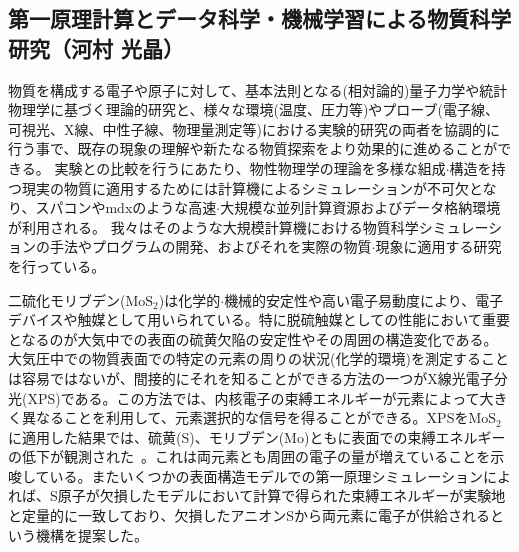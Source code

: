 \subsection{第一原理計算とデータ科学・機械学習による物質科学研究（河村 光晶）}

物質を構成する電子や原子に対して、基本法則となる(相対論的)量子力学や統計物理学に基づく理論的研究と、様々な環境(温度、圧力等)やプローブ(電子線、可視光、X線、中性子線、物理量測定等)における実験的研究の両者を協調的に行う事で、既存の現象の理解や新たなる物質探索をより効果的に進めることができる。
実験との比較を行うにあたり、物性物理学の理論を多様な組成$\cdot$構造を持つ現実の物質に適用するためには計算機によるシミュレーションが不可欠となり、スパコンやmdxのような高速$\cdot$大規模な並列計算資源およびデータ格納環境が利用される。
我々はそのような大規模計算機における物質科学シミュレーションの手法やプログラムの開発、およびそれを実際の物質$\cdot$現象に適用する研究を行っている。

二硫化モリブデン($\textrm{MoS}_2$)は化学的$\cdot$機械的安定性や高い電子易動度により、電子デバイスや触媒として用いられている。特に脱硫触媒としての性能において重要となるのが大気中での表面の硫黄欠陥の安定性やその周囲の構造変化である。
大気圧中での物質表面での特定の元素の周りの状況(化学的環境)を測定することは容易ではないが、間接的にそれを知ることができる方法の一つがX線光電子分光(XPS)である。この方法では、内核電子の束縛エネルギーが元素によって大きく異なることを利用して、元素選択的な信号を得ることができる。XPSを$\textrm{MoS}_2$に適用した結果では、硫黄(S)、モリブデン(Mo)ともに表面での束縛エネルギーの低下が観測された~\cite{kawamura_mos2}。これは両元素とも周囲の電子の量が増えていることを示唆している。またいくつかの表面構造モデルでの第一原理シミュレーションによれば、S原子が欠損したモデルにおいて計算で得られた束縛エネルギーが実験地と定量的に一致しており、欠損したアニオンSから両元素に電子が供給されるという機構を提案した。

